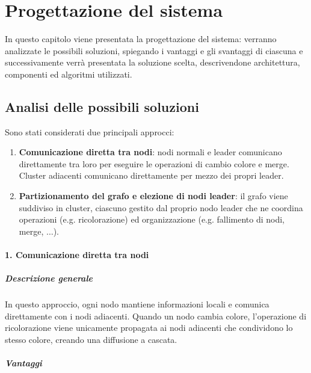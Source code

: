 \documentclass[12pt, a4paper]{report}
\begin{document}
\chapter{Progettazione del sistema}

In questo capitolo viene presentata la progettazione del sistema: verranno analizzate le possibili soluzioni, spiegando i vantaggi e gli svantaggi di ciascuna e successivamente verr\`a presentata la soluzione scelta, descrivendone architettura, componenti ed algoritmi utilizzati.

\section{Analisi delle possibili soluzioni}

Sono stati considerati due principali approcci:

\begin{enumerate}
    \item \textbf{Comunicazione diretta tra nodi}: nodi normali e leader comunicano direttamente tra loro per eseguire le operazioni di cambio colore e merge. Cluster adiacenti comunicano direttamente per mezzo dei propri leader.
    \item \textbf{Partizionamento del grafo e elezione di nodi leader}: il grafo viene suddiviso in cluster, ciascuno gestito dal proprio nodo leader che ne coordina operazioni (e.g. ricolorazione) ed organizzazione (e.g. fallimento di nodi, merge, $\ldots$).
\end{enumerate}

\subsubsection{1. Comunicazione diretta tra nodi}

\paragraph{Descrizione generale}
\begin{flushleft}
In questo approccio, ogni nodo mantiene informazioni locali e comunica direttamente con i nodi adiacenti. Quando un nodo cambia colore, l'operazione di ricolorazione viene unicamente propagata ai nodi adiacenti che condividono lo stesso colore, creando una diffusione a cascata.
\end{flushleft}

\paragraph{Vantaggi}
\end{document}
